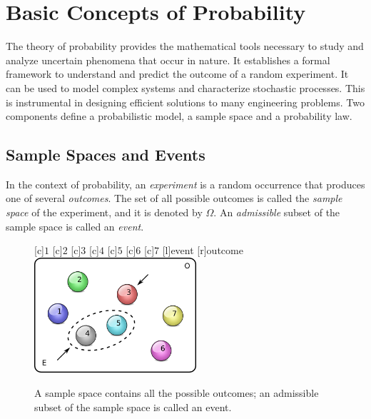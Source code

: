 \chapter{Basic Concepts of Probability}

The theory of probability provides the mathematical tools necessary to study and analyze uncertain phenomena that occur in nature.
It establishes a formal framework to understand and predict the outcome of a random experiment.
It can be used to model complex systems and characterize stochastic processes.
This is instrumental in designing efficient solutions to many engineering problems.
Two components define a probabilistic model, a sample space and a probability law.


\section{Sample Spaces and Events}

In the context of probability, an \emph{experiment} is a random occurrence that produces one of several \emph{outcomes}.
The set of all possible outcomes is called the \emph{sample space} of the experiment, and it is denoted by $\Omega$.
An \emph{admissible} subset of the sample space is called an \emph{event}.

\begin{figure}[htb!]
\begin{center}
\begin{psfrags}
[c]{$1$}
[c]{$2$}
[c]{$3$}
[c]{$4$}
[c]{$5$}
[c]{$6$}
[c]{$7$}
[l]{event}
[r]{outcome}
\includegraphics[height=4.275cm]{Figures/2Chapter/samplespace}
\end{psfrags}
\caption{A sample space contains all the possible outcomes; an admissible subset of the sample space is called an event.}
\label{figure:SampleSpace}
\end{center}
\end{figure}

